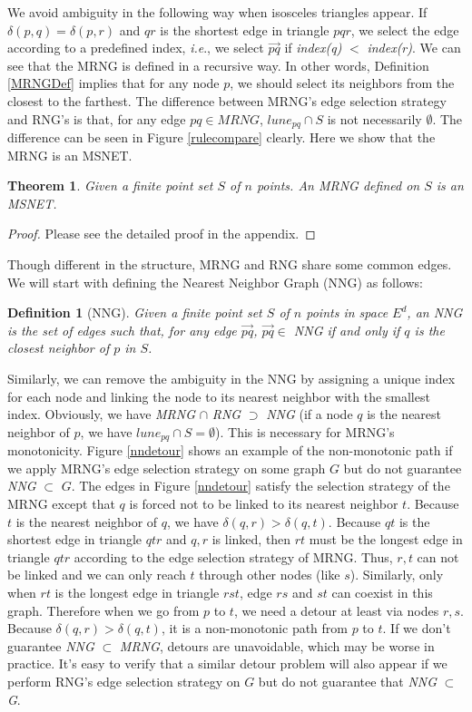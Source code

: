 \documentclass{vldb}
\newtheorem{theorem}{Theorem}
\newtheorem{definition}{Definition}
\def\ie {\emph{i.e}.} \def\Ie{\emph{I.e}.}
\begin{document}
We avoid ambiguity in the following way when isosceles triangles appear. If $\delta(p,q) = \delta(p,r)$ and $qr$ is the shortest edge in triangle $pqr$, we select the edge according to a predefined index, \ie , we select $\overset{\longrightarrow}{pq}$ if \textit{index(q)} $<$ \textit{index(r)}. We can see that the MRNG is defined in a recursive way. In other words, Definition \ref{MRNGDef} implies that for any node $p$, we should select its neighbors from the closest to the farthest. The difference between MRNG's edge selection strategy and RNG's is that, for any edge $pq\in MRNG$, $lune_{pq} \cap S$ is not necessarily $\emptyset$. The difference can be seen in Figure \ref{rulecompare} clearly. Here we show that the MRNG is an MSNET.

\begin{theorem}
\label{MRNGProve}
Given a finite point set $S$ of $n$ points. An MRNG defined on $S$ is an MSNET.
\end{theorem}
\begin{proof}
Please see the detailed proof in the appendix.
\end{proof}


Though different in the structure, MRNG and RNG share some common edges. We will start with defining the Nearest Neighbor Graph (NNG) as follows: 
\begin{definition}[NNG]
Given a finite point set $S$ of $n$ points in space $E^d$, an NNG is the set of edges such that, for any edge $\overset{\longrightarrow}{pq}$, $\overset{\longrightarrow}{pq} \in $ NNG if and only if $q$ is the closest neighbor of $p$ in $S$.
\end{definition}

Similarly, we can remove the ambiguity in the NNG by assigning a unique index for each node and linking the node to its nearest neighbor with the smallest index. Obviously, we have \textit{MRNG} $\cap$ \textit{RNG} $\supset$ \textit{NNG} (if a node $q$ is the nearest neighbor of $p$, we have $lune_{pq} \cap S = \emptyset$). This is necessary for MRNG's monotonicity. Figure \ref{nndetour} shows an example of the non-monotonic path if we apply MRNG's edge selection strategy on some graph $G$ but do not guarantee \textit{NNG} $\subset$ $G$. The edges in Figure \ref{nndetour} satisfy the selection strategy of the MRNG except that $q$ is forced not to be linked to its nearest neighbor $t$. Because $t$ is the nearest neighbor of $q$, we have $\delta(q,r) > \delta(q,t)$. Because $qt$ is the shortest edge in triangle $qtr$ and $q,r$ is linked, then $rt$ must be the longest edge in triangle $qtr$ according to the edge selection strategy of MRNG. Thus, $r,t$ can not be linked and we can only reach $t$ through other nodes (like $s$). Similarly, only when $rt$ is the longest edge in triangle $rst$, edge $rs$ and $st$ can coexist in this graph. Therefore when we go from $p$ to $t$, we need a detour at least via nodes $r,s$. Because $\delta(q,r) > \delta(q,t)$, it is a non-monotonic path from $p$ to $t$. If we don't guarantee \textit{NNG} $\subset$ \textit{MRNG}, detours are unavoidable, which may be worse in practice. It's easy to verify that a similar detour problem will also appear if we perform RNG's edge selection strategy on $G$ but do not guarantee that \textit{NNG} $\subset$ \textit{G}.
\end{document}
